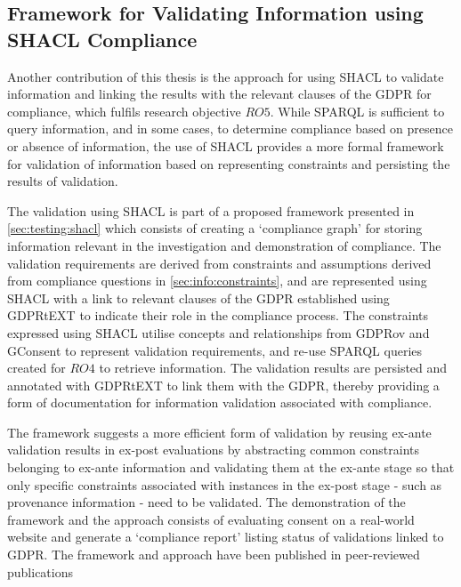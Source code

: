 \subsection{Framework for Validating Information using SHACL Compliance}\label{sec:contributions:validation}
Another contribution of this thesis is the approach for using SHACL to validate information and linking the results with the relevant clauses of the GDPR for compliance, which fulfils research objective $RO5$.
While SPARQL is sufficient to query information, and in some cases, to determine compliance based on presence or absence of information, the use of SHACL provides a more formal framework for validation of information based on representing constraints and persisting the results of validation.

The validation using SHACL is part of a proposed framework presented in \autoref{sec:testing:shacl} which consists of creating a `compliance graph' for storing information relevant in the investigation and demonstration of compliance.
The validation requirements are derived from constraints and assumptions derived from compliance questions in \autoref{sec:info:constraints}, and are represented using SHACL with a link to relevant clauses of the GDPR established using GDPRtEXT to indicate their role in the compliance process.
The constraints expressed using SHACL utilise concepts and relationships from GDPRov and GConsent to represent validation requirements, and re-use SPARQL queries created for $RO4$ to retrieve information.
The validation results are persisted and annotated with GDPRtEXT to link them with the GDPR, thereby providing a form of documentation for information validation associated with compliance.

The framework suggests a more efficient form of validation by reusing ex-ante validation results in ex-post evaluations by abstracting common constraints belonging to ex-ante information and validating them at the ex-ante stage so that only specific constraints associated with instances in the ex-post stage - such as provenance information - need to be validated.
The demonstration of the framework and the approach consists of evaluating consent on a real-world website and generate a `compliance report' listing status of validations linked to GDPR.
The framework and approach have been published in peer-reviewed publications \cite{pandit_towards_2018,pandit_exploring_2018,pandit_test-driven_2019}

